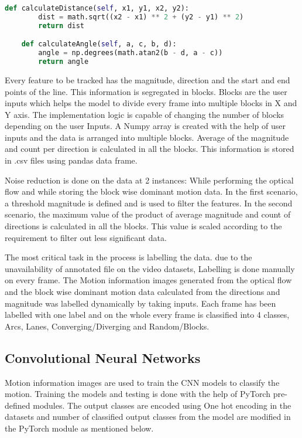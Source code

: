 \begin{lstlisting}[language=Python, frame=single, caption=Logic to calculate Direction and magnitude]
    def calculateDistance(self, x1, y1, x2, y2):
        dist = math.sqrt((x2 - x1) ** 2 + (y2 - y1) ** 2)
        return dist

    def calculateAngle(self, a, c, b, d):
        angle = np.degrees(math.atan2(b - d, a - c))
        return angle
\end{lstlisting}

Every feature to be tracked has the magnitude, direction and the start and end points of the line. This information is segregated in blocks. Blocks are the user inputs which helps the model to divide every frame into multiple blocks in X and Y axis. The implementation logic is capable of changing the number of blocks depending on the user Inputs. A Numpy array is created with the help of user inputs and the data is arranged into multiple blocks. Average of the magnitude and count per direction is calculated in all the blocks. This information is stored in .csv files using pandas data frame.

Noise reduction is done on the data at 2 instances: While performing the optical flow and  while storing the block wise dominant motion data. In the first scenario, a threshold magnitude is defined and is used to filter the features. In the second scenario, the maximum value of the product of average magnitude and count of directions is calculated in all the blocks. This value is scaled according to the requirement to filter out less significant data.

The most critical task in the process is labelling the data. due to the unavailability of annotated file on the video datasets, Labelling is done manually on every frame. The Motion information images generated from the optical flow and the block wise dominant motion data calculated from the directions and magnitude was labelled dynamically by taking inputs. Each frame has been labelled with one label and on the whole every frame is classified into 4 classes, Arcs, Lanes, Converging/Diverging and Random/Blocks.

\subsection{Convolutional Neural Networks}
Motion information images are used to train the CNN models to classify the motion. Training the models and testing is done with the help of PyTorch pre-defined modules. The output classes are encoded using One hot encoding in the datasets and number of classified output classes from the model are modified in the PyTorch module as mentioned below.


